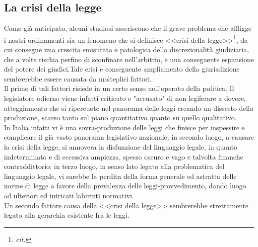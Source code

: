 \subsection{La crisi della legge}
Come già anticipato, alcuni studiosi asseriscono che il grave problema che affligge i nostri ordinamenti sia un fenomeno che si definisce <<crisi della legge>>\footnote{\textit{cit.}}, da cui consegue una crescita smisurata e patologica della discrezionalità giudiziaria, che a volte rischia perfino di sconfinare nell’arbitrio, e una conseguente espansione del potere dei giudici.Tale crisi e conseguente ampliamento della giurisdizione sembrerebbe essere causata da molteplici fattori.
\\Il primo di tali fattori risiede in un certo senso nell'operato della politica. Il legislatore odierno viene infatti criticato e "accusato" di non legiferare a dovere, atteggiamento che si ripercuote nel panorama delle leggi creando un dissesto della produzione, scarso tanto sul piano quantitativo quanto su quello qualitativo. \\In Italia infatti vi è una sovra-produzione delle leggi che finisce per inspessire e complicare il già vasto panorama legislativo nazionale; in secondo luogo, a causare la crisi della legge, si annovera la disfunzione del linguaggio legale, in quanto indeterminato e di eccessiva ampiezza, spesso oscuro e vago e talvolta finanche contraddittorio; in terzo luogo, in senso lato legato alla problematica del linguaggio legale, vi sarebbe la perdita della forma generale ed astratta delle norme di legge a favore della prevalenza delle leggi-provvedimento, dando luogo ad ulteriori ed intricati labirinti normativi.
\\Un secondo fattore causa della <<crisi della legge>> sembrerebbe strettamente legato alla gerarchia esistente fra le leggi.
